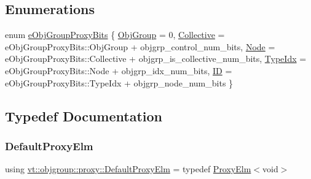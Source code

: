 \subsection*{Enumerations}
\begin{DoxyCompactItemize}
\item 
enum \hyperlink{namespacevt_1_1objgroup_1_1proxy_a5cfde1a666e49070fcc0312e51d53777}{e\+Obj\+Group\+Proxy\+Bits} \{ \newline
\hyperlink{namespacevt_1_1objgroup_1_1proxy_a5cfde1a666e49070fcc0312e51d53777a235be9f56eb1337ea20d2937ffb7a8a4}{Obj\+Group} = 0, 
\hyperlink{namespacevt_1_1objgroup_1_1proxy_a5cfde1a666e49070fcc0312e51d53777ab1d0e2d0ac577126529814c35a32c003}{Collective} = e\+Obj\+Group\+Proxy\+Bits\+:\+:Obj\+Group + objgrp\+\_\+control\+\_\+num\+\_\+bits, 
\hyperlink{namespacevt_1_1objgroup_1_1proxy_a5cfde1a666e49070fcc0312e51d53777a179829552544d5bb4b3bac56d953e06a}{Node} = e\+Obj\+Group\+Proxy\+Bits\+:\+:Collective + objgrp\+\_\+is\+\_\+collective\+\_\+num\+\_\+bits, 
\hyperlink{namespacevt_1_1objgroup_1_1proxy_a5cfde1a666e49070fcc0312e51d53777a3993e012fc4525e4ddc1a6e30a75714c}{Type\+Idx} = e\+Obj\+Group\+Proxy\+Bits\+:\+:Node + objgrp\+\_\+idx\+\_\+num\+\_\+bits, 
\newline
\hyperlink{namespacevt_1_1objgroup_1_1proxy_a5cfde1a666e49070fcc0312e51d53777a6de04ce539708519a851efd1640f2b48}{ID} = e\+Obj\+Group\+Proxy\+Bits\+:\+:Type\+Idx + objgrp\+\_\+node\+\_\+num\+\_\+bits
 \}
\end{DoxyCompactItemize}


\subsection{Typedef Documentation}
\mbox{\label{namespacevt_1_1objgroup_1_1proxy_ae207233400f23aa10c30217cdb369c54}} 
\subsubsection{\texorpdfstring{Default\+Proxy\+Elm}{DefaultProxyElm}}
{\footnotesize\ttfamily using \hyperlink{namespacevt_1_1objgroup_1_1proxy_ae207233400f23aa10c30217cdb369c54}{vt\+::objgroup\+::proxy\+::\+Default\+Proxy\+Elm} = typedef \hyperlink{structvt_1_1objgroup_1_1proxy_1_1_proxy_elm}{Proxy\+Elm}$<$void$>$}

